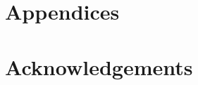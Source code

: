 \documentclass[preprint,3p,times, review]{elsarticle}
\begin{document}
\section*{Appendices}
\section*{Acknowledgements}
% 


\end{document}
